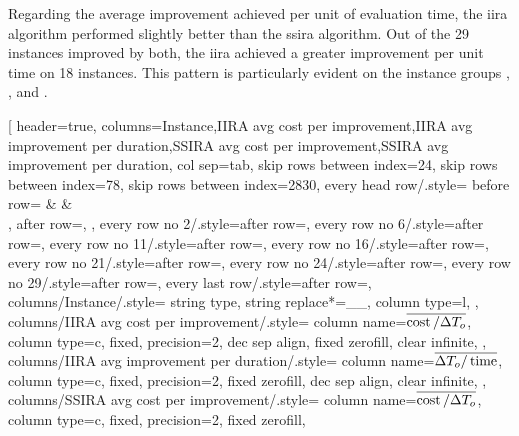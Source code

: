 Regarding the average improvement achieved per unit of evaluation time,
the \ac{iira} algorithm performed slightly better than the \ac{ssira} algorithm.
Out of the 29 instances improved by both,
the \ac{iira} achieved a greater improvement per unit time on 18 instances.
This pattern is particularly evident on the instance groups
, , and .

\begin{table}[p]
    \centering
    \pgfplotstabletypeset[
        header=true, %
        columns={Instance,{IIRA avg cost per improvement},{IIRA avg improvement per duration},{SSIRA avg cost per improvement},{SSIRA avg improvement per duration}},
        col sep=tab, %
        skip rows between index={2}{4},
        skip rows between index={7}{8},
        skip rows between index={28}{30},
        every head row/.style={
            before row={
            \toprule
            &  &  \\
            },
            after row=\midrule,
        },
        every row no 2/.style={after row={\midrule}},
        every row no 6/.style={after row={\midrule}},
        every row no 11/.style={after row={\midrule}},
        every row no 16/.style={after row={\midrule}},
        every row no 21/.style={after row={\midrule}},
        every row no 24/.style={after row={\midrule}},
        every row no 29/.style={after row={\midrule}},
        every last row/.style={after row={\bottomrule}},
        columns/Instance/.style={
            string type,
            string replace*={_}{\_},
            column type=l,
            },
        columns/IIRA avg cost per improvement/.style={
            column name=$\overline{\operatorname{cost} / \Delta T_{o}}$,
            column type=c,
            fixed, precision=2,
            dec sep align,
            fixed zerofill,
            clear infinite,
            },
        columns/IIRA avg improvement per duration/.style={
            column name=$\overline{\Delta T_{o} / \operatorname{time}}$,
            column type=c,
            fixed, precision=2,
            fixed zerofill,
            dec sep align,
            clear infinite,
            },
        columns/SSIRA avg cost per improvement/.style={
            column name=$\overline{\operatorname{cost}/ \Delta T_{o}} $,
            column type=c,
            fixed, precision=2,
            fixed zerofill,
}
\end{table}
